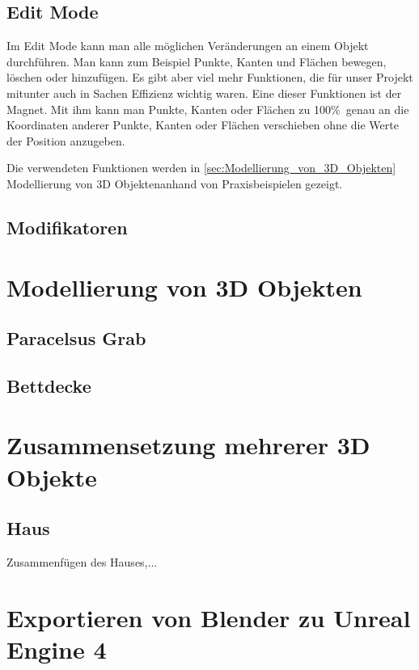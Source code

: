 \subsection{Edit Mode}
Im Edit Mode kann man alle möglichen Veränderungen an einem Objekt durchführen. Man kann zum Beispiel Punkte, Kanten und Flächen bewegen, löschen oder hinzufügen.
Es gibt aber viel mehr Funktionen, die für unser Projekt mitunter auch in Sachen Effizienz wichtig waren. Eine dieser Funktionen ist der Magnet. Mit ihm kann man Punkte, Kanten oder Flächen zu 100\%\ genau an
die Koordinaten anderer Punkte, Kanten oder Flächen verschieben ohne die Werte der Position anzugeben.

Die verwendeten Funktionen werden in  \autoref{sec:Modellierung_von_3D_Objekten} \dq  Modellierung von 3D Objekten\dq anhand von
Praxisbeispielen gezeigt.

\subsection{Modifikatoren}

\section{Modellierung von 3D Objekten}
\label{sec:Modellierung_von_3D_Objekten}
\subsection{Paracelsus Grab}
\subsection{Bettdecke}

\section{Zusammensetzung mehrerer 3D Objekte}
\subsection{Haus}
Zusammenfügen des Hauses,...

\section{Exportieren von Blender zu Unreal Engine 4}
\label{sec:Exportieren_von_Blender_zu_Unreal_Engine_4}